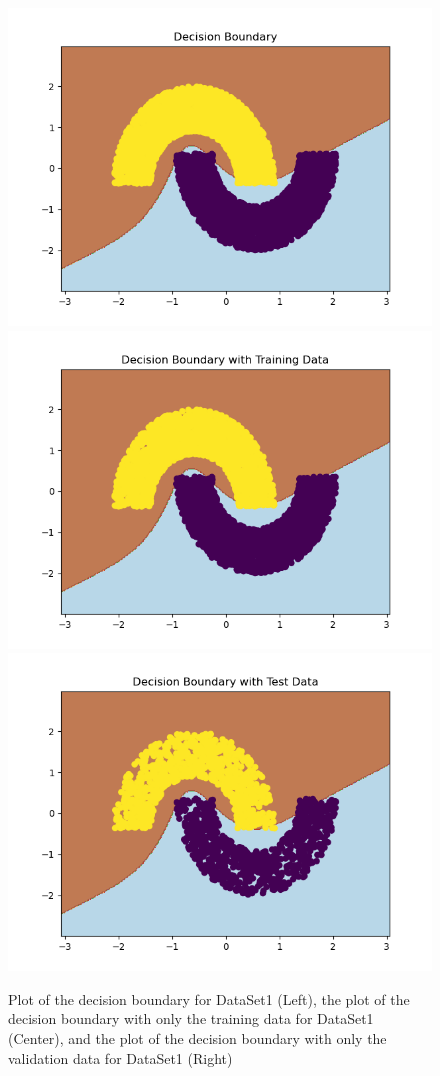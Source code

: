 \documentclass[letterpaper, 12pt]{article}
\begin{document}
\begin{figure}[H]
\centering
\includegraphics[scale = 0.33]{DataSet1BoundaryPlot}
\includegraphics[scale = 0.33]{DataSet1TrainBoundaryPlot}
\includegraphics[scale = 0.33]{DataSet1TestBoundaryPlot}
\caption{Plot of the decision boundary for DataSet1 (Left), the plot of the decision boundary with only the training data for DataSet1 (Center), and the plot of the decision boundary with only the validation data for DataSet1 (Right)}
\end{figure}
\end{document}
